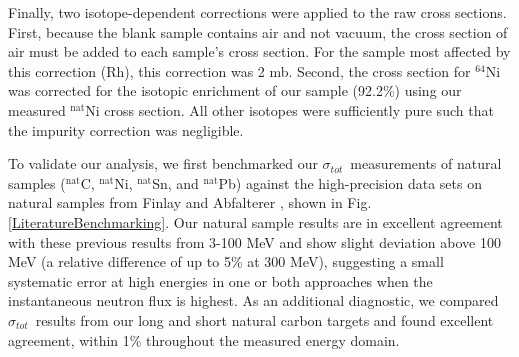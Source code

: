 \documentclass[twocolumn,secnumarabic,amssymb, nobibnotes, aps, prl,
superscriptaddress, nobalancelastpage]{revtex4}
\newcommand{\tot}{\ensuremath{\sigma_{tot}}}
\begin{document}
Finally, two isotope-dependent corrections were applied to the raw cross
sections. First, because the blank sample contains air and not vacuum,
the cross section of air must be added to each sample's cross section.
For the sample most affected by this correction (Rh), this correction was 2 mb.
Second, the cross section for $^{64}$Ni was corrected for the isotopic enrichment of our
sample (92.2\%) using our measured $^{\text{nat}}$Ni cross section. All other isotopes were 
sufficiently pure such that the impurity correction was negligible.

To validate our analysis, we first benchmarked our \tot\ measurements of natural samples
($^{\text{nat}}$C, $^{\text{nat}}$Ni, $^{\text{nat}}$Sn, and
$^{\text{nat}}$Pb) against the high-precision data sets on natural samples from Finlay
\cite{Finlay1993} and Abfalterer \cite{Abfalterer2001}, shown in Fig.
\ref{LiteratureBenchmarking}. Our natural sample results
are in excellent agreement with 
these previous results from 3-100 MeV and show slight deviation above 100 MeV (a
relative difference of up to 5\% at 300 MeV), suggesting a small systematic
error at high energies in one or both approaches when the instantaneous neutron
flux is highest. As an additional diagnostic, we compared 
\tot\ results from our long and short natural carbon targets and
found excellent agreement, within 1\% throughout the measured energy domain.
\end{document}
